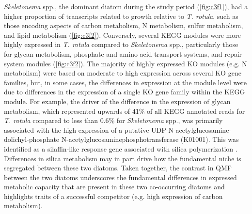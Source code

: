\textit{Skeletonema} spp., the dominant diatom during the study period (\cref{fig:c3f1}), had a higher proportion of transcripts related to growth relative to \textit{T. rotula}, such as those encoding aspects of carbon metabolism, N metabolism, sulfur metabolism, and lipid metabolism (\cref{fig:c3f2}). Conversely, several KEGG modules were more highly expressed in \textit{T. rotula} compared to \textit{Skeletonema} spp., particularly those for glycan metabolism, phosphate and amino acid transport systems, and repair system modules (\cref{fig:c3f2}). The majority of highly expressed KO modules (e.g. N metabolism) were based on moderate to high expression across several KO gene families, but, in some cases, the differences in expression at the module level were due to differences in the expression of a single KO gene family within the KEGG module. For example, the driver of the difference in the expression of glycan metabolism, which represented upwards of 41\% of all KEGG annotated reads for \textit{T. rotula} compared to less than 0.6\% for \textit{Skeletonema} spp., was primarily associated with the high expression of a putative UDP-N-acetylglucosamine-dolichyl-phosphate N-acetylglucosaminephosphotransferase (K01001). This was identified as a silaffin-like response gene associated with silica polymerization \citep{Shrestha2012}. Differences in silica metabolism may in part drive how the fundamental niche is segregated between these two diatoms. Taken together, the contrast in QMF between the two diatoms underscores the fundamental differences in expressed metabolic capacity that are present in these two co-occurring diatoms and highlights traits of a successful competitor (e.g. high expression of carbon metabolism).\par

